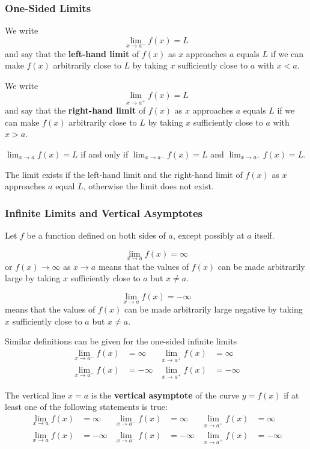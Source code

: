 \subsubsection*{One-Sided Limits}
\begin{definition}
    We write
    \[\lim_{x\to a^-}f(x)=L\]
    and say that the \textbf{left-hand limit} of \(f(x)\) as \(x\) approaches
    \(a\) equals \(L\) if we can make \(f(x)\) arbitrarily close to \(L\) by
    taking \(x\) sufficiently close to \(a\) with \(x<a\).
\end{definition}
\begin{definition}
    We write
    \[\lim_{x\to a^+}f(x)=L\]
    and say that the \textbf{right-hand limit} of \(f(x)\) as \(x\) approaches
    \(a\) equals \(L\) if we can make \(f(x)\) arbitrarily close to \(L\) by
    taking \(x\) sufficiently close to \(a\) with \(x>a\).
\end{definition}
\begin{theorem}
    \(\displaystyle{\lim_{x\to a}f(x)=L}\) if and only if
    \(\displaystyle{\lim_{x\to a^-}f(x)}=L\) and
    \(\displaystyle{\lim_{x\to a^+}f(x)}=L\).
\end{theorem}
The limit exists if the left-hand limit and the right-hand limit of \(f(x)\)
as \(x\) approaches \(a\) equal \(L\),
otherwise the limit does not exist.

\subsubsection*{Infinite Limits and Vertical Asymptotes}
Let \(f\) be a function defined on both sides of \(a\),
except possibly at \(a\) itself.
\begin{definition}
    \[\lim_{x\to a}f(x)=\infty\]
    or \(f(x)\to\infty\) as \(x\to a\) means that the values of \(f(x)\) can
    be made arbitrarily large by taking \(x\) sufficiently close to \(a\) but
    \(x\neq a\).
\end{definition}
\begin{definition}
    \[\lim_{x\to a}f(x)=-\infty\]
    means that the values of \(f(x)\) can be made arbitrarily large negative
    by taking \(x\) sufficiently close to \(a\) but \(x\neq a\).
\end{definition}
Similar definitions can be given for the one-sided infinite limits
\begin{align*}
    \lim_{x\to a^-}f(x) &= \infty & \lim_{x\to a^+}f(x) &= \infty \\
    \lim_{x\to a^-}f(x) &= -\infty & \lim_{x\to a^+}f(x) &= -\infty
\end{align*}
\begin{definition}
    The vertical line \(x=a\) is the \textbf{vertical asymptote} of the curve
    \(y=f(x)\) if at least one of the following statements is true:
    \begin{align*}
        \lim_{x\to a}f(x) &= \infty & \lim_{x\to a^-}f(x) &= \infty
        & \lim_{x\to a^+}f(x) &= \infty \\
        \lim_{x\to a}f(x) &= -\infty & \lim_{x\to a^-}f(x) &= -\infty
        & \lim_{x\to a^+}f(x) &= -\infty
    \end{align*}
\end{definition}